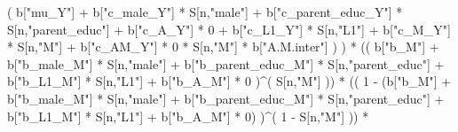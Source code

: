\documentclass[
]{book}
\newenvironment{Shaded}{\begin{snugshade}}{\end{snugshade}}
\newcommand{\DecValTok}[1]{\textcolor[rgb]{0.00,0.00,0.81}{#1}}
\newcommand{\NormalTok}[1]{#1}
\newcommand{\SpecialCharTok}[1]{\textcolor[rgb]{0.00,0.00,0.00}{#1}}
\newcommand{\StringTok}[1]{\textcolor[rgb]{0.31,0.60,0.02}{#1}}
\begin{document}
\begin{Shaded}
\begin{Highlighting}[]
\NormalTok{                          ( b[}\StringTok{"mu\_Y"}\NormalTok{] }\SpecialCharTok{+} 
\NormalTok{                              b[}\StringTok{"c\_male\_Y"}\NormalTok{] }\SpecialCharTok{*}\NormalTok{ S[n,}\StringTok{"male"}\NormalTok{] }\SpecialCharTok{+} 
\NormalTok{                              b[}\StringTok{"c\_parent\_educ\_Y"}\NormalTok{] }\SpecialCharTok{*}\NormalTok{ S[n,}\StringTok{"parent\_educ"}\NormalTok{] }\SpecialCharTok{+} 
\NormalTok{                              b[}\StringTok{"c\_A\_Y"}\NormalTok{] }\SpecialCharTok{*} \DecValTok{0} \SpecialCharTok{+} 
\NormalTok{                              b[}\StringTok{"c\_L1\_Y"}\NormalTok{] }\SpecialCharTok{*}\NormalTok{ S[n,}\StringTok{"L1"}\NormalTok{] }\SpecialCharTok{+}
\NormalTok{                              b[}\StringTok{"c\_M\_Y"}\NormalTok{] }\SpecialCharTok{*}\NormalTok{ S[n,}\StringTok{"M"}\NormalTok{] }\SpecialCharTok{+} 
\NormalTok{                              b[}\StringTok{"c\_AM\_Y"}\NormalTok{] }\SpecialCharTok{*} \DecValTok{0} \SpecialCharTok{*}\NormalTok{ S[n,}\StringTok{"M"}\NormalTok{] }\SpecialCharTok{*}\NormalTok{ b[}\StringTok{"A.M.inter"}\NormalTok{] ) ) }\SpecialCharTok{*}
\NormalTok{      (( b[}\StringTok{"b\_M"}\NormalTok{] }\SpecialCharTok{+} 
\NormalTok{           b[}\StringTok{"b\_male\_M"}\NormalTok{] }\SpecialCharTok{*}\NormalTok{ S[n,}\StringTok{"male"}\NormalTok{] }\SpecialCharTok{+} 
\NormalTok{           b[}\StringTok{"b\_parent\_educ\_M"}\NormalTok{] }\SpecialCharTok{*}\NormalTok{ S[n,}\StringTok{"parent\_educ"}\NormalTok{] }\SpecialCharTok{+} 
\NormalTok{           b[}\StringTok{"b\_L1\_M"}\NormalTok{] }\SpecialCharTok{*}\NormalTok{ S[n,}\StringTok{"L1"}\NormalTok{] }\SpecialCharTok{+}
\NormalTok{           b[}\StringTok{"b\_A\_M"}\NormalTok{] }\SpecialCharTok{*} \DecValTok{0}\NormalTok{ )}\SpecialCharTok{\^{}}\NormalTok{( S[n,}\StringTok{"M"}\NormalTok{] )) }\SpecialCharTok{*} 
\NormalTok{      (( }\DecValTok{1} \SpecialCharTok{{-}}\NormalTok{ (b[}\StringTok{"b\_M"}\NormalTok{] }\SpecialCharTok{+} 
\NormalTok{                b[}\StringTok{"b\_male\_M"}\NormalTok{] }\SpecialCharTok{*}\NormalTok{ S[n,}\StringTok{"male"}\NormalTok{] }\SpecialCharTok{+} 
\NormalTok{                b[}\StringTok{"b\_parent\_educ\_M"}\NormalTok{] }\SpecialCharTok{*}\NormalTok{ S[n,}\StringTok{"parent\_educ"}\NormalTok{] }\SpecialCharTok{+} 
\NormalTok{                b[}\StringTok{"b\_L1\_M"}\NormalTok{] }\SpecialCharTok{*}\NormalTok{ S[n,}\StringTok{"L1"}\NormalTok{] }\SpecialCharTok{+}
\NormalTok{                b[}\StringTok{"b\_A\_M"}\NormalTok{] }\SpecialCharTok{*} \DecValTok{0}\NormalTok{) )}\SpecialCharTok{\^{}}\NormalTok{( }\DecValTok{1} \SpecialCharTok{{-}}\NormalTok{ S[n,}\StringTok{"M"}\NormalTok{] ))  }\SpecialCharTok{*}

\end{Highlighting}
\end{Shaded}
\end{document}
